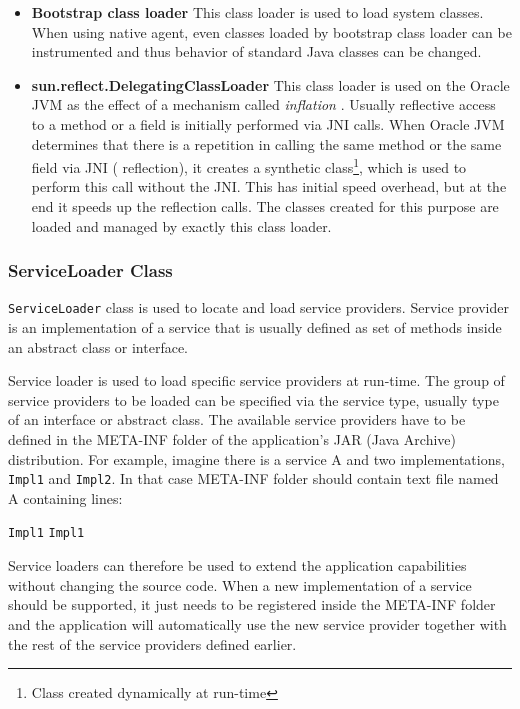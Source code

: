 \begin{itemize}
	\item\textbf{Bootstrap class loader} \newline
	This class loader is used to load system classes. When using native agent, even classes loaded by bootstrap class loader can be instrumented and thus behavior of standard Java classes can be changed.
	
	\item  \textbf{sun.reflect.DelegatingClassLoader} \newline
	This class loader is used on the Oracle JVM as the effect of a mechanism called \textit{inflation} \cite{inflation}. Usually reflective access to a method or a field is initially performed via JNI calls. When Oracle JVM determines that there is a repetition in calling the same method or the same field via JNI ( reflection), it creates a synthetic class\footnote{Class created dynamically at run-time}, which is used to perform this call without the JNI. This has initial speed overhead, but at the end it speeds up the reflection calls. The classes created for this purpose are loaded and managed by exactly this class loader. 
\end{itemize}
\subsubsection{ServiceLoader Class}
\texttt{ServiceLoader} class is used to locate and load service providers. Service provider is an implementation of a service that is usually defined as set of methods inside an abstract class or interface. 

Service loader is used to load specific service providers at run-time. The group of service providers to be loaded can be specified via the service type, usually type of an interface or abstract class. The available service providers have to be defined in the META-INF folder of the application's JAR (Java Archive) distribution. For example, imagine there is a service A and two implementations, \texttt{Impl1} and \texttt{Impl2}. In that case META-INF folder should contain text file named A containing lines:
\begin{center}
\texttt{Impl1} \newline
\texttt{Impl1}  \newline
\end{center}
Service loaders can therefore be used to extend the application capabilities without changing the source code. When a new implementation of a service should be supported, it just needs to be registered inside the META-INF folder and the application will automatically use the new service provider together with the rest of the service providers defined earlier.

